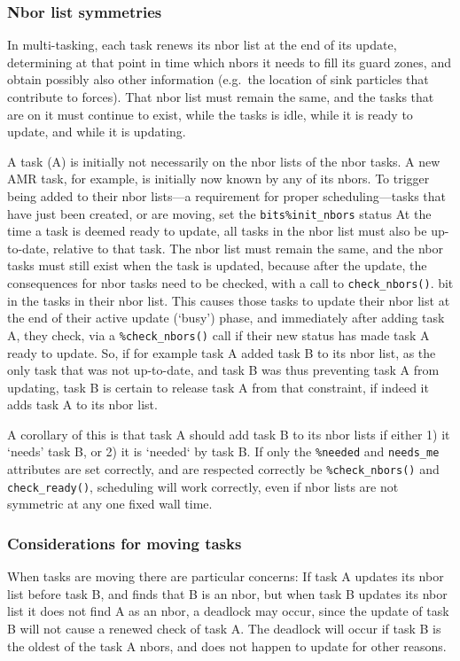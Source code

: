 \documentclass[paper=a4,fontsize=11pt]{scrartcl}
\numberwithin{equation}{section}		%
\numberwithin{figure}{section}			%
\numberwithin{table}{section}				%
\newcommand{\codecolor}{\color{Blue}}
\newcommand{\Code}[1]{{\codecolor\texttt{#1}}}
\def\checknbors{\Code{check\_nbors()}}
\begin{document}
\subsubsection{Nbor list symmetries}
In multi-tasking, each task renews its nbor list at the end of its update, determining at that point in time which nbors it needs to fill its guard zones, and obtain possibly also other information (e.g.\ the location of sink particles that contribute to forces).   That nbor list must remain the same, and the tasks that are on it must continue to exist, while the tasks is idle, while it is ready to update, and while it is updating.

A task (A) is initially not necessarily on the nbor lists of the nbor tasks.  A new AMR task, for example, is initially now known by any of its nbors.  To trigger being added to their nbor lists---a requirement for proper scheduling---tasks that have just been created, or are moving, set the \verb|bits%init_nbors| status At the time a task is deemed ready to update, all tasks in the nbor list must also be up-to-date, relative to that task.  The nbor list must remain the same, and the nbor tasks must still exist when the task is updated, because after the update, the consequences for nbor tasks need to be checked, with a call to \checknbors.
bit in the tasks in their nbor list.  This causes those tasks to update their nbor 
list at the end of their active update (`busy') phase, and immediately after adding task A, they check, via a \verb|%check_nbors()| call if their new status has made task A ready to update.  So, if for example task A added task B to its nbor list, as the only task that was not up-to-date, and task B was thus preventing task A from updating, task B is certain to release task A from that constraint, if indeed it adds task A to its nbor list.

A corollary of this is that task A should add task B to its nbor lists if either 1) it `needs' task B, or 2) it is `needed` by task B.  If only the \verb|%needed| and \verb|needs_me| attributes are set correctly, and are respected correctly be \verb|%check_nbors()| and \verb|check_ready()|, scheduling will work correctly, even if nbor lists are not symmetric at any one fixed wall time.

\subsubsection{Considerations for moving tasks}
When tasks are moving there are particular concerns:  If task A updates its nbor list before task B, and finds that B is an nbor, but when task B updates its nbor list it does not find A as an nbor, a deadlock may occur, since the update of task B will not cause a renewed check of task A.  The deadlock will occur if task B is the oldest of the task A nbors, and does not happen to update for other reasons.
\end{document}
